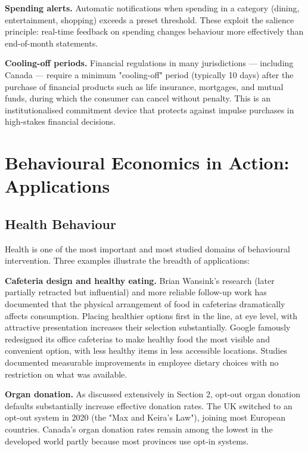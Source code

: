 \documentclass[12pt, letterpaper]{article}
\begin{document}
\textbf{Spending alerts.} Automatic notifications when spending in a category (dining, entertainment, shopping) exceeds a preset threshold. These exploit the salience principle: real-time feedback on spending changes behaviour more effectively than end-of-month statements.

\textbf{Cooling-off periods.} Financial regulations in many jurisdictions --- including Canada --- require a minimum "cooling-off" period (typically 10 days) after the purchase of financial products such as life insurance, mortgages, and mutual funds, during which the consumer can cancel without penalty. This is an institutionalised commitment device that protects against impulse purchases in high-stakes financial decisions.

\medskip


\section{Behavioural Economics in Action: Applications}



\subsection{Health Behaviour}


Health is one of the most important and most studied domains of behavioural intervention. Three examples illustrate the breadth of applications:

\textbf{Cafeteria design and healthy eating.} Brian Wansink's research (later partially retracted but influential) and more reliable follow-up work has documented that the physical arrangement of food in cafeterias dramatically affects consumption. Placing healthier options first in the line, at eye level, with attractive presentation increases their selection substantially. Google famously redesigned its office cafeterias to make healthy food the most visible and convenient option, with less healthy items in less accessible locations. Studies documented measurable improvements in employee dietary choices with no restriction on what was available.

\textbf{Organ donation.} As discussed extensively in Section 2, opt-out organ donation defaults substantially increase effective donation rates. The UK switched to an opt-out system in 2020 (the "Max and Keira's Law"), joining most European countries. Canada's organ donation rates remain among the lowest in the developed world partly because most provinces use opt-in systems.
\end{document}
